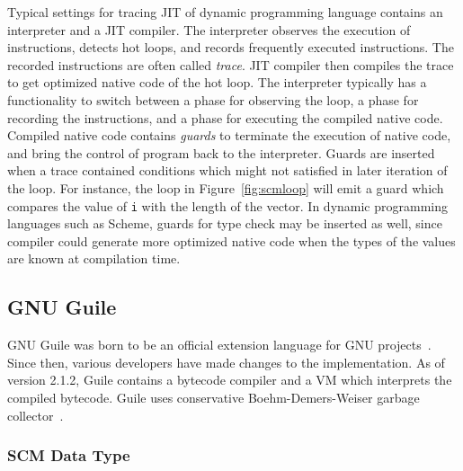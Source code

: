 \documentclass[preprint, 10pt]{sigplanconf}
\begin{document}
Typical settings for tracing JIT of dynamic programming language contains an
interpreter and a JIT compiler. The interpreter observes the execution of
instructions, detects hot loops, and records frequently executed
instructions. The recorded instructions are often called \textit{trace}. JIT
compiler then compiles the trace to get optimized native code of the hot
loop. The interpreter typically has a functionality to switch between a phase
for observing the loop, a phase for recording the instructions, and a phase
for executing the compiled native code.  Compiled native code contains
\textit{guards} to terminate the execution of native code, and bring the
control of program back to the interpreter. Guards are inserted when a trace
contained conditions which might not satisfied in later iteration of the
loop. For instance, the loop in
Figure~\hyperref[fig:scmloop]{\ref{fig:scmloop}} will emit a guard which
compares the value of \texttt{i} with the length of the vector. In dynamic
programming languages such as Scheme, guards for type check may be inserted as
well, since compiler could generate more optimized native code when the types
of the values are known at compilation time.

\subsection{GNU Guile}
\label{sec:backgroundguile}

GNU Guile was born to be an official extension language for GNU
projects~\cite{Galassi02guilereference}. Since then, various developers have
made changes to the implementation. As of version 2.1.2, Guile contains a
bytecode compiler and a VM which interprets the compiled bytecode. Guile uses
conservative Boehm-Demers-Weiser garbage collector~\cite{boehm1988garbage}.

\subsubsection{SCM Data Type}
\label{sec:scmdatatype}
\end{document}
